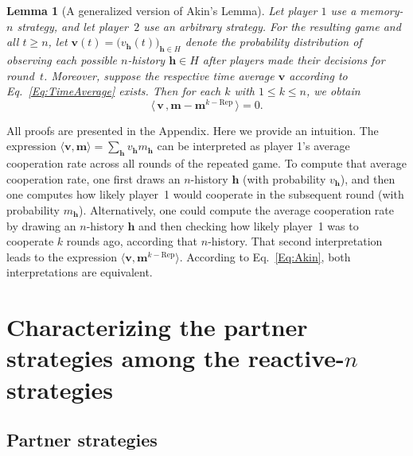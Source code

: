 \documentclass[11pt]{article}
\theoremstyle{plainCl1}
\newtheorem{lemma}{Lemma}
\theoremstyle{plainCl2}
\begin{document}

\begin{lemma}[A generalized version of Akin's Lemma]\label{lemma:AkinGeneralised}
Let player $1$ use a memory-$n$ strategy, and let player~$2$ use an arbitrary
strategy. For the resulting game and all $t\!\ge\!n$, let $\mathbf{v}(t)\!=\!\big( v_\mathbf{h}(t) \big)_{\mathbf{h}\in H}$ denote the probability distribution of observing each possible $n$-history $\mathbf{h}\!\in\! H$ after players made their decisions for round~$t$. Moreover, suppose the respective time average $\mathbf{v}$ according to Eq.~\eqref{Eq:TimeAverage} exists. Then for each $k$ with $1\!\le\!k\!\le\!n$, we obtain
\begin{equation} \label{Eq:Akin}
\big\langle\, \mathbf{v}\, , \mathbf{m}-\mathbf{m}^{k-\text{Rep}}\,\big\rangle = 0. 
\end{equation}
\end{lemma}


\noindent
All proofs are presented in the Appendix. Here we provide an intuition.
The expression $\langle \mathbf{v}, \mathbf{m} \rangle \!=\! \sum_\mathbf{h} v_\mathbf{h}m_\mathbf{h}$ can be interpreted as player 1's average cooperation rate across all rounds of the repeated game.
To compute that average cooperation rate, one first draws an $n$-history $\mathbf{h}$ (with probability $v_\mathbf{h}$), and then one computes how likely player~1 would cooperate in the subsequent round (with probability $m_\mathbf{h}$). 
Alternatively, one could compute the average cooperation rate by drawing an $n$-history $\mathbf{h}$ and then checking how likely player~1 was to cooperate $k$ rounds ago, according that $n$-history. 
That second interpretation leads to the expression $\langle \mathbf{v}, \mathbf{m}^{k-\text{Rep}} \rangle$. 
According to Eq.~\eqref{Eq:Akin}, both interpretations are equivalent.\\






\section{Characterizing the partner strategies among the reactive-$n$ strategies}

\subsection{Partner strategies}
\end{document}
